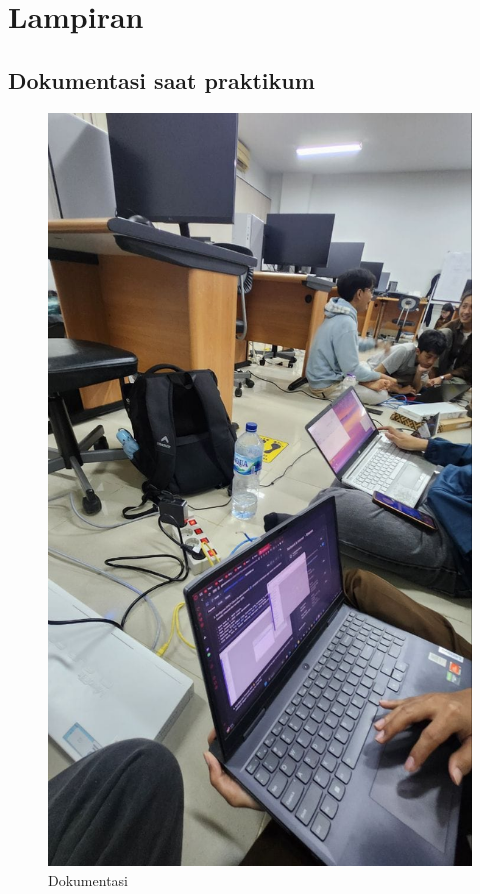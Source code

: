\section{Lampiran}
\subsection{Dokumentasi saat praktikum}
\begin{figure}[H]
        \centering
        \includegraphics[width=0.5\linewidth]{P1/img/17.jpeg}
        \caption{Dokumentasi}
        \label{fig:gambar1}
    \end{figure}

